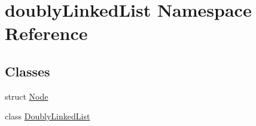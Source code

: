 \hypertarget{namespacedoublyLinkedList}{\section{doubly\-Linked\-List Namespace Reference}
\label{namespacedoublyLinkedList}
}
\subsection*{Classes}
\begin{DoxyCompactItemize}
\item 
struct \hyperlink{structdoublyLinkedList_1_1Node}{Node}
\item 
class \hyperlink{classdoublyLinkedList_1_1DoublyLinkedList}{Doubly\-Linked\-List}
\end{DoxyCompactItemize}
